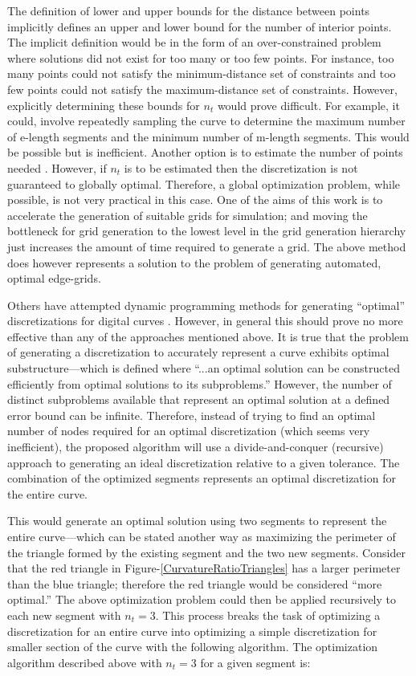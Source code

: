 The definition of lower and upper bounds for the distance between points 
implicitly defines an upper and lower bound for the number of interior 
points.  The implicit definition would be in the form of an 
over-constrained problem where solutions did not exist for too many or too 
few points.  For instance, too many points could not satisfy the 
minimum-distance set of constraints and too few points could not satisfy 
the maximum-distance set of constraints.  However, explicitly determining 
these bounds for $n_t$ would prove difficult.  For example, it could, 
involve repeatedly sampling the curve to determine the maximum number of 
e-length segments and the minimum number of m-length segments.  This would 
be possible but is inefficient.  Another option is to estimate the number 
of points needed \cite{cuilliere97}.  However, if $n_t$ is to be estimated 
then the discretization is not guaranteed to globally optimal. Therefore, 
a global optimization problem, while possible, is not 
very practical in this case.  One of the aims of this work is to 
accelerate the generation of suitable grids for simulation; and moving the 
bottleneck for grid generation to the lowest level in the grid generation 
hierarchy just increases the amount of time required to generate a grid.  
The above method does however represents a solution to the problem of 
generating automated, optimal edge-grids.

Others have attempted dynamic programming methods for generating ``optimal'' discretizations for digital curves \cite{horng02}.  However, in general this should prove no more effective than any of the approaches mentioned above.  It is true that the problem of generating a discretization to accurately represent a curve exhibits optimal substructure—which is defined where ``...an optimal solution can be constructed efficiently from optimal solutions to its subproblems.'' \cite{cormen01}  However, the number of distinct subproblems available that represent an optimal solution at a defined error bound can be infinite.  Therefore, instead of trying to find an optimal number of nodes required for an optimal discretization (which seems very inefficient), the proposed algorithm will use a divide-and-conquer (recursive) approach to generating an ideal discretization relative to a given tolerance.  The combination of the optimized segments represents an optimal discretization for the entire curve.

This would generate an optimal solution using two segments to represent the entire curve—which can be stated another way as maximizing the perimeter of the triangle formed by the existing segment and the two new segments.  Consider that the red triangle in Figure-\ref{CurvatureRatioTriangles} has a larger perimeter than the blue triangle; therefore the red triangle would be considered ``more optimal.'' The above optimization problem could then be applied recursively to each new segment with $n_t=3$.  This process breaks the task of optimizing a discretization for an entire curve into optimizing a simple discretization for smaller section of the curve with the following algorithm.  The optimization algorithm described above with $n_t=3$ for a given segment is:

